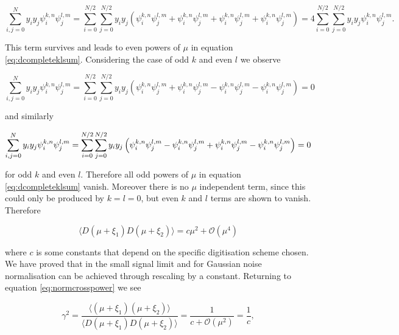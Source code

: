 \documentclass[apj]{emulateapj}
\begin{document}
\begin{equation}
\sum_{i,j = 0}^N y_i y_j \psi_i^{k, n} \psi_j^{l, m} = \sum_{i = 0}^{N/2}\sum_{j = 0}^{N/2} y_i y_j \left( \psi_i^{k, n} \psi_j^{l, m} + \psi_{i}^{k, n} \psi_j^{l, m} + \psi_i^{k, n} \psi_{j}^{l, m} + \psi_{i}^{k, n} \psi_{j}^{l, m} \right) = 4 \sum_{i = 0}^{N/2}\sum_{j = 0}^{N/2} y_i y_j \psi_i^{k, n} \psi_j^{l, m}.
\end{equation}

This term survives and leads to even powers of $\mu$ in equation \ref{eq:dcompleteklsum}. Considering the case of odd $k$ and even $l$ we observe

\begin{equation}
\sum_{i,j = 0}^N y_i y_j \psi_i^{k, n} \psi_j^{l, m} = \sum_{i = 0}^{N/2}\sum_{j = 0}^{N/2} y_i y_j \left( \psi_i^{k, n} \psi_j^{l, m} + \psi_{i}^{k, n} \psi_j^{l, m} - \psi_i^{k, n} \psi_{j}^{l, m} - \psi_{i}^{k, n} \psi_{j}^{l, m} \right) = 0
\end{equation}

and similarly

\begin{equation}
\sum_{i,j = 0}^N y_i y_j \psi_i^{k, n} \psi_j^{l, m} = \sum_{i = 0}^{N/2}\sum_{j = 0}^{N/2} y_i y_j \left( \psi_i^{k, n} \psi_j^{l, m} - \psi_{i}^{k, n} \psi_j^{l, m} + \psi_i^{k, n} \psi_{j}^{l, m} - \psi_{i}^{k, n} \psi_{j}^{l, m} \right) = 0\\
\end{equation}

for odd $k$ and even $l$. Therefore all odd powers of $\mu$ in equation \ref{eq:dcompleteklsum} vanish. Moreover there is no $\mu$ independent term, since this could only be produced by $k=l=0$, but even $k$ and $l$ terms are shown to vanish. Therefore

\begin{equation}
\langle D(\mu + \xi_1) D(\mu + \xi_2) \rangle = c \mu^2 + \mathcal{O}(\mu^4)
\end{equation}

where $c$ is some constants that depend on the specific digitisation scheme chosen. We have proved that in the small signal limit and for Gaussian noise normalisation can be achieved through rescaling by a constant. Returning to equation \ref{eq:normcrosspower} we see

\begin{equation}
\gamma^2  = \frac{\langle (\mu + \xi_1) (\mu + \xi_2) \rangle}{\langle D(\mu + \xi_1) D(\mu + \xi_2) \rangle} = \frac{1}{c + \mathcal{O}(\mu^2)} = \frac{1}{c},
\end{equation}
\end{document}
